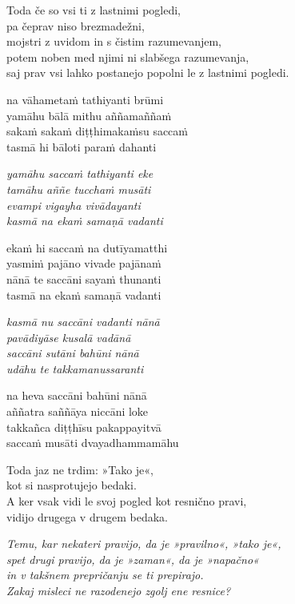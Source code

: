 Toda če so vsi ti z lastnimi pogledi,\\\vin pa čeprav niso brezmadežni,\\
mojstri z uvidom in s čistim razumevanjem,\\
potem noben med njimi ni slabšega razumevanja,\\
saj prav vsi lahko postanejo popolni le z lastnimi pogledi.


\clearpage

na vāhametaṁ tathiyanti brūmi\\
yamāhu bālā mithu aññamaññaṁ\\
sakaṁ sakaṁ diṭṭhimakaṁsu saccaṁ\\
tasmā hi bāloti paraṁ dahanti

\emph{yamāhu saccaṁ tathiyanti eke\\
tamāhu aññe tucchaṁ musāti}\\
\emph{evampi vigayha vivādayanti\\
kasmā na ekaṁ samaṇā vadanti}

ekaṁ hi saccaṁ na dutīyamatthi\\
yasmiṁ pajāno vivade pajānaṁ\\
nānā te saccāni sayaṁ thunanti\\
tasmā na ekaṁ samaṇā vadanti

\emph{kasmā nu saccāni vadanti nānā\\
pavādiyāse kusalā vadānā}\\
\emph{saccāni sutāni bahūni nānā\\
udāhu te takkamanussaranti}

na heva saccāni bahūni nānā\\
aññatra saññāya niccāni loke\\
takkañca diṭṭhīsu pakappayitvā\\
saccaṁ musāti dvayadhammamāhu


\clearpage

Toda jaz ne trdim: »Tako je«,\\
kot si nasprotujejo bedaki.\\
A ker vsak vidi le svoj pogled kot resnično pravi,\\
vidijo drugega v drugem bedaka.

\emph{Temu, kar nekateri pravijo, da je »pravilno«, »tako je«,\\
spet drugi pravijo, da je »zaman«, da je »napačno«\\
in v takšnem prepričanju se ti prepirajo.\\
Zakaj misleci ne razodenejo zgolj ene resnice?}

